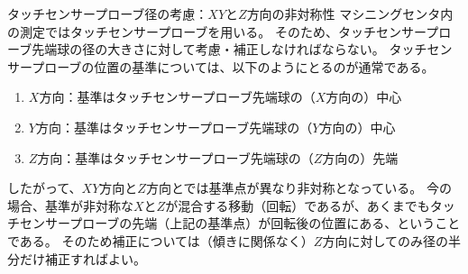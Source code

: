\clearpage
\begin{Column}{タッチセンサープローブ径の考慮：$XY$と$Z$方向の非対称性}
マシニングセンタ内の測定ではタッチセンサープローブを用いる。
そのため、タッチセンサープローブ先端球の径の大きさに対して考慮・補正しなければならない。
タッチセンサープローブの位置の基準については、以下のようにとるのが通常である。
\begin{enumerate}
\item $X$方向：基準はタッチセンサープローブ先端球の（$X$方向の）中心
\item $Y$方向：基準はタッチセンサープローブ先端球の（$Y$方向の）中心
\item $Z$方向：基準はタッチセンサープローブ先端球の（$Z$方向の）先端
\end{enumerate}
したがって、$XY$方向と$Z$方向とでは基準点が異なり非対称となっている。
今の場合、基準が非対称な$X$と$Z$が混合する移動（回転）であるが、あくまでもタッチセンサープローブの先端（上記の基準点）が回転後の位置にある、ということである。
そのため補正については（傾きに関係なく）$Z$方向に対してのみ径の半分だけ補正すればよい。
\end{Column}


